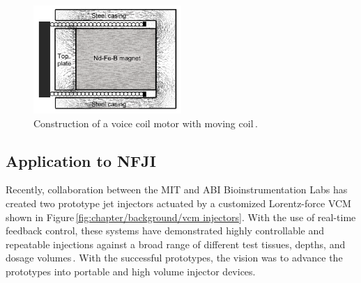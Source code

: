     
    \begin{figure}[!ht]
      \centering
      \includegraphics[width=0.5\textwidth]{chap2/images/vcm_cut_view.png}
      \caption[Construction of a voice coil motor with moving coil]{Construction of a voice coil motor with moving coil\,\cite{taberner2006}.}
      \label{fig:chapter/background/vcm cut view}
    \end{figure}
    
    
    \subsection{Application to \acs{NFJI}}          \label{Chapter:background/voice coil motors for NFJI/application}
    
    
    Recently, collaboration between the \ac{MIT} and \ac{ABI} Bioinstrumentation Labs has created two prototype jet injectors actuated by a customized Lorentz-force \ac{VCM}\,\cite{taberner2006,ruddy2014} shown in Figure\,\ref{fig:chapter/background/vcm injectors}. With the use of real-time feedback control, these systems have demonstrated highly controllable and repeatable injections against a broad range of different test tissues, depths, and dosage volumes\,\cite{taberner2012}. With the successful prototypes, the vision was to advance the prototypes into portable and high volume injector devices.


